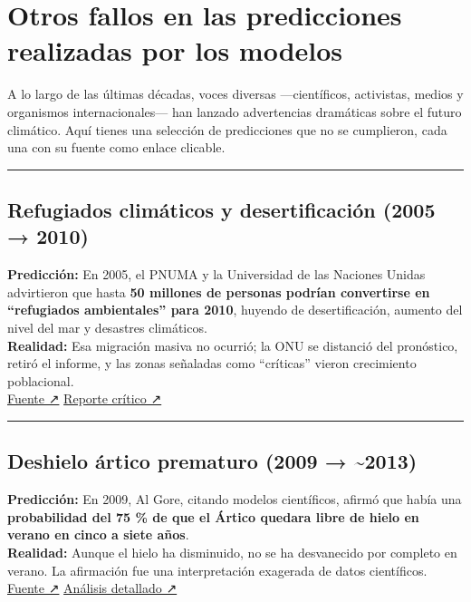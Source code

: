 \documentclass[
  10pt,
  a4paper,
  DIV=11,
  numbers=noendperiod,
  open=any]{scrreprt}
\numberwithin{equation}{chapter}
\numberwithin{equation}{chapter}
\renewcommand{\[}{\begin{equation}}
\renewcommand{\]}{\end{equation}}
\begin{document}
\section{Otros fallos en las predicciones realizadas por los
modelos}\label{otros-fallos-en-las-predicciones-realizadas-por-los-modelos}

A lo largo de las últimas décadas, voces diversas ---científicos,
activistas, medios y organismos internacionales--- han lanzado
advertencias dramáticas sobre el futuro climático. Aquí tienes una
selección de predicciones que no se cumplieron, cada una con su fuente
como enlace clicable.

\begin{center}\rule{0.5\linewidth}{0.5pt}\end{center}

\subsection{Refugiados climáticos y desertificación (2005 →
2010)}\label{refugiados-climuxe1ticos-y-desertificaciuxf3n-2005-2010}

\textbf{Predicción:} En 2005, el PNUMA y la Universidad de las Naciones
Unidas advirtieron que hasta \textbf{50 millones de personas podrían
convertirse en ``refugiados ambientales'' para 2010}, huyendo de
desertificación, aumento del nivel del mar y desastres climáticos.\\
\textbf{Realidad:} Esa migración masiva no ocurrió; la ONU se distanció
del pronóstico, retiró el informe, y las zonas señaladas como
``críticas'' vieron crecimiento poblacional.\\
\href{https://www.theguardian.com/environment/2005/oct/12/naturaldisasters.climatechange1}{Fuente
↗} \textbar{}
\href{https://climate-diplomacy.org/magazine/conflict/un-embarrassed-forecast-climate-refugees}{Reporte
crítico ↗}

\begin{center}\rule{0.5\linewidth}{0.5pt}\end{center}

\subsection{Deshielo ártico prematuro (2009 →
\textasciitilde2013)}\label{deshielo-uxe1rtico-prematuro-2009-2013}

\textbf{Predicción:} En 2009, Al Gore, citando modelos científicos,
afirmó que había una \textbf{probabilidad del 75 \% de que el Ártico
quedara libre de hielo en verano en cinco a siete años}.\\
\textbf{Realidad:} Aunque el hielo ha disminuido, no se ha desvanecido
por completo en verano. La afirmación fue una interpretación exagerada
de datos científicos.\\
\href{https://www.reuters.com/article/fact-check/al-gore-did-not-predict-ice-caps-melting-by-2013-but-misrepresented-data-idUSL1N2RV0K6}{Fuente
↗} \textbar{}
\href{https://www.politifact.com/factchecks/2023/may/31/alex-epstein/chart-on-arctic-sea-ice-extent-has-no-bearing-on-a/}{Análisis
detallado ↗}
\end{document}

